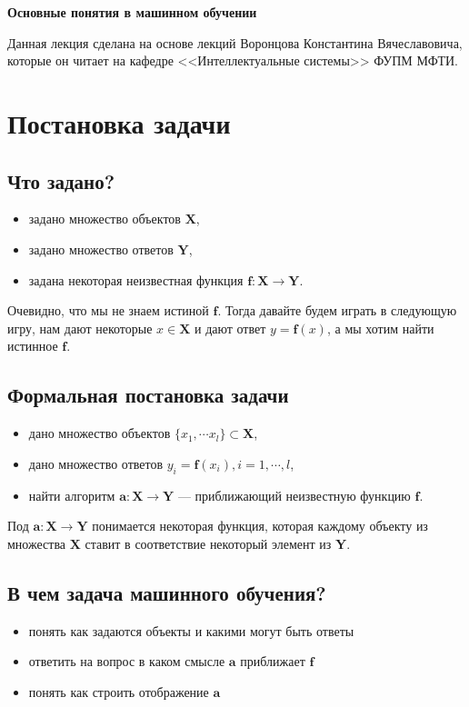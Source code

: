 \documentclass[12pt, twoside]{article}
\begin{document}
 

\begin{center}
{\LARGE\bf
Основные понятия в машинном обучении
}
\end{center}

Данная лекция сделана на основе лекций Воронцова Константина Вячеславовича, которые он читает на кафедре <<Интеллектуальные системы>> ФУПМ МФТИ. 

\section{Постановка задачи}

\subsection{Что задано?}
\begin{itemize}
	\item задано множество объектов $\textbf{X}$,
	\item задано множество ответов $\textbf{Y}$,
	\item задана некоторая неизвестная функция $\textbf{f}: \textbf{X} \rightarrow \textbf{Y}$.
\end{itemize}

Очевидно, что мы не знаем истиной $\textbf{f}$. Тогда давайте будем играть в следующую игру, нам дают некоторые $x \in \textbf{X}$ и дают ответ $y = \textbf{f}(x)$, а мы хотим найти истинное $\textbf{f}$.

\subsection{Формальная постановка задачи}
\begin{itemize}
	\item дано множество объектов $\{x_1, \cdots x_l\} \subset \textbf{X}$,
	\item дано множество ответов $y_i = \textbf{f}(x_i), i=1,\cdots, l$,
	\item найти алгоритм $\textbf{a}:\textbf{X} \rightarrow \textbf{Y}$ --- приближающий неизвестную функцию $\textbf{f}$.
\end{itemize}

Под $\textbf{a}:\textbf{X} \rightarrow \textbf{Y}$ понимается некоторая функция, которая каждому объекту из множества $\textbf{X}$ ставит в соответствие некоторый элемент из \textbf{Y}.

\subsection{В чем задача машинного обучения?}
\begin{itemize}
	\item понять как задаются объекты и какими могут быть ответы
	\item ответить на вопрос в каком смысле $\textbf{a}$ приближает $\textbf{f}$
	\item понять как строить отображение $\textbf{a}$
\end{itemize}
\end{document}
